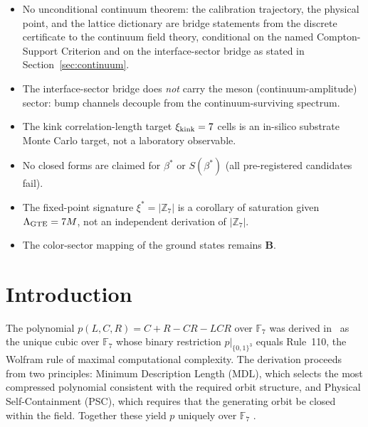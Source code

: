 \documentclass[11pt]{article}
\theoremstyle{remark}
\newcommand{\CatB}{\textbf{B}}
\begin{document}
\begin{tcolorbox}[
  colback=blue!5,colframe=blue!40!gray,title=What This Paper Does NOT Claim,
  fonttitle=\bfseries,breakable]
\small
\begin{itemize}[leftmargin=1.8em,itemsep=2pt,topsep=2pt]
  \item No unconditional continuum theorem: the calibration trajectory, the
        physical point, and the lattice dictionary are bridge statements from
        the discrete certificate to the continuum field theory, conditional on
        the named Compton-Support Criterion and on the interface-sector bridge
        as stated in Section~\ref{sec:continuum}.
  \item The interface-sector bridge does \emph{not} carry the meson
        (continuum-amplitude) sector: bump channels decouple from the
        continuum-surviving spectrum.
  \item The kink correlation-length target $\xi_{\rm kink} = 7$ cells is an
        in-silico substrate Monte Carlo target, not a laboratory observable.
  \item No closed forms are claimed for $\beta^*$ or $S(\beta^*)$
        (all pre-registered candidates fail).
  \item The fixed-point signature $\xi^* = |\mathbb{Z}_7|$ is a corollary of
        saturation given $\Lambda_{\rm GTE} = 7M$, not an independent
        derivation of $|\mathbb{Z}_7|$.
  \item The color-sector mapping of the ground states remains \CatB{}.
\end{itemize}
\end{tcolorbox}

\section{Introduction}
\label{sec:intro}

The polynomial $p(L,C,R) = C + R - CR - LCR$ over $\mathbb{F}_7$ was derived
in~\cite{SpivackGTEPolynomialWolfram} as the unique cubic over $\mathbb{F}_7$
whose binary restriction $p|_{\{0,1\}^3}$ equals Rule~110, the Wolfram rule of
maximal computational complexity. The derivation proceeds from two principles:
Minimum Description Length (MDL), which selects the most compressed polynomial
consistent with the required orbit structure, and Physical Self-Containment
(PSC), which requires that the generating orbit be closed within the field.
Together these yield $p$ uniquely over $\mathbb{F}_7$
\cite{SpivackGTEPolynomialWolfram, SpivackGTECompleteFramework}.
\end{document}
